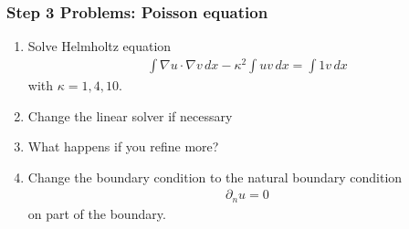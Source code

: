 \begin{frame}
  \frametitle{Step 3 Problems: Poisson equation}
  \begin{enumerate}
  \item Solve Helmholtz equation
    \begin{gather*}
      \int \nabla u\cdot\nabla v\,dx - \kappa^2 \int uv\,dx= \int 1v\,dx
    \end{gather*}
    with $\kappa = 1, 4, 10$.
  \item Change the linear solver if necessary
  \item What happens if you refine more?
  \item Change the boundary condition to the natural boundary condition
    \begin{gather*}
      \partial_n u = 0
    \end{gather*}
    on part of the boundary.
  \end{enumerate}
\end{frame}
